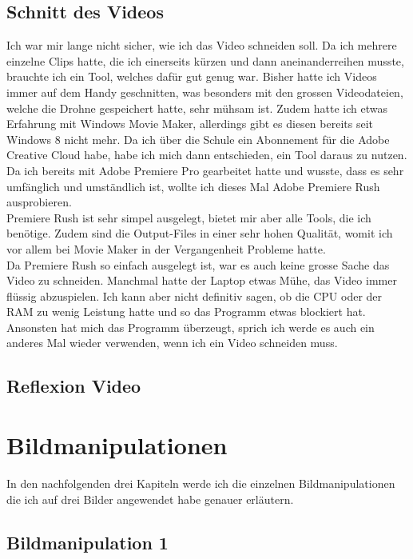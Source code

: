 \documentclass[11pt]{article}
\begin{document}
    \subsection{Schnitt des Videos}
    Ich war mir lange nicht sicher, wie ich das Video schneiden soll. Da ich mehrere einzelne Clips hatte, die ich einerseits kürzen und dann
    aneinanderreihen musste, brauchte ich ein Tool, welches dafür gut genug war. Bisher hatte ich Videos immer auf dem Handy geschnitten, was
    besonders mit den grossen Videodateien, welche die Drohne gespeichert hatte, sehr mühsam ist. Zudem hatte ich etwas Erfahrung mit Windows
    Movie Maker, allerdings gibt es diesen bereits seit Windows 8 nicht mehr. Da ich über die Schule ein Abonnement für die Adobe Creative Cloud
    habe, habe ich mich dann entschieden, ein Tool daraus zu nutzen. Da ich bereits mit Adobe Premiere Pro gearbeitet hatte und wusste, dass
    es sehr umfänglich und umständlich ist, wollte ich dieses Mal Adobe Premiere Rush ausprobieren.\\
    Premiere Rush ist sehr simpel ausgelegt, bietet mir aber alle Tools, die ich benötige. Zudem sind die Output-Files in einer sehr hohen
    Qualität, womit ich vor allem bei Movie Maker in der Vergangenheit Probleme hatte.\\
    Da Premiere Rush so einfach ausgelegt ist, war es auch keine grosse Sache das Video zu schneiden. Manchmal hatte der Laptop etwas Mühe,
    das Video immer flüssig abzuspielen. Ich kann aber nicht definitiv sagen, ob die CPU oder der RAM zu wenig Leistung hatte und so das Programm
    etwas blockiert hat.\\
    Ansonsten hat mich das Programm überzeugt, sprich ich werde es auch ein anderes Mal wieder verwenden, wenn ich ein Video schneiden muss.

    \subsection{Reflexion Video}

    \section{Bildmanipulationen}
    In den nachfolgenden drei Kapiteln werde ich die einzelnen Bildmanipulationen die ich auf drei Bilder angewendet habe genauer erläutern.

    \subsection{Bildmanipulation 1}
\end{document}

